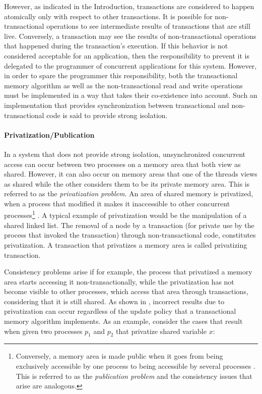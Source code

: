 \documentclass[11pt,letterpaper]{article}
\begin{document}
However, as indicated in the Introduction, transactions are considered to  
happen atomically only  with respect to other transactions.  It is possible
for non-transactional operations to see intermediate results  
of transactions that are still  live. Conversely, a transaction may see the
results of non-transactional operations that happened during  
the  transaction{}'s   execution.  If  this  behavior   is  not  considered
acceptable for an application, then the responsibility to prevent it is  
delegated   to  the   programmer  of   concurrent  applications   for  this
system. However, in order to spare the programmer this responsibility,  
both the  transactional memory algorithm  as well as  the non-transactional
read and write operations must be implemented in a way  
that  takes their co-existence  into account.  Such an  implementation that
provides synchronization  between transactional and  non-transactional code
is said to provide strong isolation.  


\paragraph{Privatization/Publication}
In  a  system  that  does  not  provide  strong  isolation,  unsynchronized
concurrent access can occur between two processes on a memory  
area that both  view as shared. However, it can also  occur on memory areas
that one of the threads views as shared while the other  
considers them to  be its private memory area. This is  referred to as the
{\it privatization problem}. An area of shared memory is privatized,  
when a process  that modified it makes it  inaccessible to other concurrent
processes\footnote{Conversely, a memory area is made public  
when it goes from being exclusively accessible by one process to being 
accessible by several processes \cite{spear08} . 
This is referred  to as the {\it publication problem} and the consistency 
issues that arise are analogous.}  \cite{spear07}.  
A typical  example of privatization would  be the manipulation  of a shared
linked list. The  removal of a node by a  transaction (for private
use   by  the process  that  invoked the  transaction) through  
non-transactional  code,  constitutes  privatization.  A  transaction  that
privatizes  a memory area   is called privatizing transaction.

Consistency problems  arise if for  example, the process that  privatized a
memory area starts accessing it non-transactionally, while the  
privatization has not become visible  to other processes, which access that
area through transactions, considering that it is still shared.  
As shown in \cite{spear07}, incorrect results due to
privatization can occur regardless of the update policy  
that a  transactional memory algorithm implements. As  an example, consider
the cases that result when given two processes $p_1$ and   
$p_2$ that privatize shared variable $x$:
\end{document}
